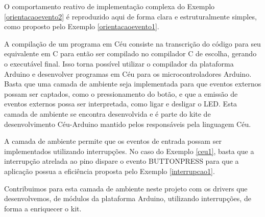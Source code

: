 \documentclass[11pt]{article}
\begin{document}
\par O comportamento reativo de implementação complexa do Exemplo \ref{orientacaoevento2} é reproduzido aqui de forma clara e estruturalmente simples, como proposto pelo Exemplo \ref{orientacaoevento1}.
\par A compilação de um programa em Céu consiste na transcrição do código para seu equivalente em C para então ser compilado no compilador C de escolha, gerando o executável final. Isso torna possível utilizar o compilador da plataforma Arduino e desenvolver programas em Céu para os microcontroladores Arduino. Basta que uma camada de ambiente seja implementada para que eventos externos possam ser captados, como o pressionamento do botão, e que a emissão de eventos externos possa ser interpretada, como ligar e desligar o LED. Esta camada de ambiente se encontra desenvolvida e é parte do kite de desenvolvimento Céu-Arduino mantido pelos responsáveis pela linguagem Céu\cite{githubceuarduino}.
\par A camada de ambiente permite que os eventos de entrada possam ser implementados utilizando interrupções. No caso do Exemplo \ref{ceu1}, basta que a interrupção atrelada ao pino dispare o evento BUTTON\textunderscore PRESS para que a aplicação possua a eficiência proposta pelo Exemplo \ref{interrupcao1}.
\par Contribuimos para esta camada de ambiente neste projeto com os drivers que desenvolvemos, de módulos da plataforma Arduino, utilizando interrupções, de forma a enriquecer o kit.
\end{document}
